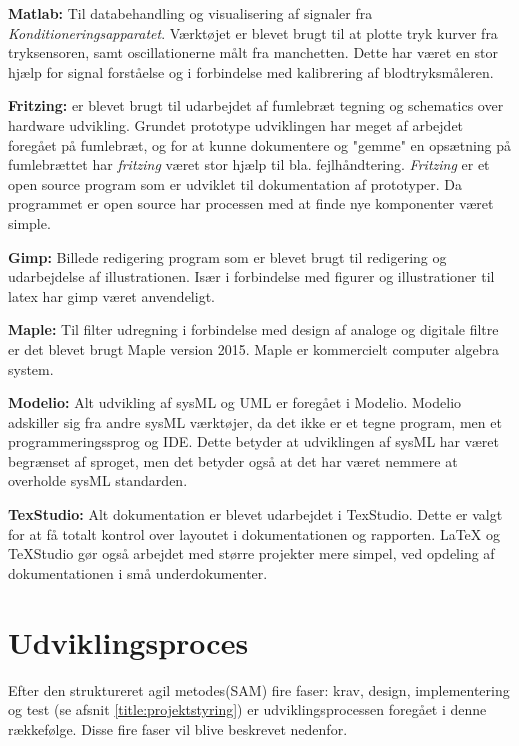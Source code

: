 \textbf{Matlab:} Til databehandling og visualisering af signaler fra \textit{Konditioneringsapparatet}. Værktøjet er blevet brugt til at plotte tryk kurver fra tryksensoren, samt oscillationerne målt fra manchetten. Dette har været en stor hjælp for signal forståelse og i forbindelse med kalibrering af blodtryksmåleren. 

\textbf{Fritzing:} er blevet brugt til udarbejdet af fumlebræt tegning og schematics over hardware udvikling. Grundet prototype udviklingen har meget af arbejdet foregået på fumlebræt, og for at kunne dokumentere og "gemme" en opsætning på fumlebrættet har \textit{fritzing} været stor hjælp til bla. fejlhåndtering. \textit{Fritzing} er et open source program som er udviklet til dokumentation af prototyper. Da programmet er open source har processen med at finde nye komponenter været simple. 

\textbf{Gimp:} Billede redigering program som er blevet brugt til redigering og udarbejdelse af illustrationen. Især i forbindelse med figurer og illustrationer til latex har gimp været anvendeligt. 

\textbf{Maple:} Til filter udregning i forbindelse med design af analoge og digitale filtre er det blevet brugt Maple version 2015. Maple er kommercielt computer algebra system. 

\textbf{Modelio:} Alt udvikling af sysML og UML er foregået i Modelio. Modelio adskiller sig fra andre sysML værktøjer, da det ikke er et tegne program, men et programmeringssprog og IDE. Dette betyder at udviklingen af sysML har været begrænset af sproget, men det betyder også at det har været nemmere at overholde sysML standarden. 

\textbf{TexStudio:} Alt dokumentation er blevet udarbejdet i TexStudio. Dette er valgt for at få totalt kontrol over layoutet i dokumentationen og rapporten. LaTeX og TeXStudio gør også arbejdet med større projekter mere simpel, ved opdeling af dokumentationen i små underdokumenter.


\section{Udviklingsproces} \label{title:udviklingMetode}
Efter den struktureret agil metodes(SAM) fire faser: krav, design, implementering og test (se afsnit \ref{title:projektstyring}) er udviklingsprocessen foregået i denne rækkefølge. Disse fire faser vil blive beskrevet nedenfor.

